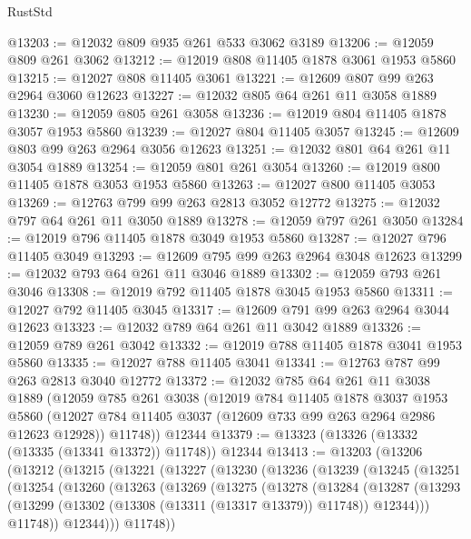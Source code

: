 \begin{lexlean}{RustStd}
\begin{coremodule}
{\begin{coremodule}
{{{{{{{{{{{{{{{{{{{{{{{{{{{{{@13203 := @12032 @809 @935 @261 @533 @3062 @3189
@13206 := @12059 @809 @261 @3062
@13212 := @12019 @808 @11405 @1878 @3061 @1953 @5860
@13215 := @12027 @808 @11405 @3061
@13221 := @12609 @807 @99 @263 @2964 @3060 @12623
@13227 := @12032 @805 @64 @261 @11 @3058 @1889
@13230 := @12059 @805 @261 @3058
@13236 := @12019 @804 @11405 @1878 @3057 @1953 @5860
@13239 := @12027 @804 @11405 @3057
@13245 := @12609 @803 @99 @263 @2964 @3056 @12623
@13251 := @12032 @801 @64 @261 @11 @3054 @1889
@13254 := @12059 @801 @261 @3054
@13260 := @12019 @800 @11405 @1878 @3053 @1953 @5860
@13263 := @12027 @800 @11405 @3053
@13269 := @12763 @799 @99 @263 @2813 @3052 @12772
@13275 := @12032 @797 @64 @261 @11 @3050 @1889
@13278 := @12059 @797 @261 @3050
@13284 := @12019 @796 @11405 @1878 @3049 @1953 @5860
@13287 := @12027 @796 @11405 @3049
@13293 := @12609 @795 @99 @263 @2964 @3048 @12623
@13299 := @12032 @793 @64 @261 @11 @3046 @1889
@13302 := @12059 @793 @261 @3046
@13308 := @12019 @792 @11405 @1878 @3045 @1953 @5860
@13311 := @12027 @792 @11405 @3045
@13317 := @12609 @791 @99 @263 @2964 @3044 @12623
@13323 := @12032 @789 @64 @261 @11 @3042 @1889
@13326 := @12059 @789 @261 @3042
@13332 := @12019 @788 @11405 @1878 @3041 @1953 @5860
@13335 := @12027 @788 @11405 @3041
@13341 := @12763 @787 @99 @263 @2813 @3040 @12772
@13372 := @12032
    @785
    @64
    @261
    @11
    @3038
    @1889
    (@12059
      @785
      @261
      @3038
      (@12019
        @784
        @11405
        @1878
        @3037
        @1953
        @5860
        (@12027 @784 @11405 @3037 (@12609 @733 @99 @263 @2964 @2986 @12623 @12928))
        @11748))
    @12344
@13379 := @13323 (@13326 (@13332 (@13335 (@13341 @13372)) @11748)) @12344
@13413 := @13203
    (@13206
      (@13212
        (@13215
          (@13221
            (@13227
              (@13230
                (@13236
                  (@13239
                    (@13245
                      (@13251
                        (@13254
                          (@13260
                            (@13263
                              (@13269
                                (@13275
                                  (@13278
                                    (@13284
                                      (@13287
                                        (@13293
                                          (@13299
                                            (@13302 (@13308 (@13311 (@13317 @13379)) @11748))
                                            @12344)))
                                      @11748))
                                  @12344)))
                            @11748))
}}}}}}}}}}}}}}}}}}}}}}}}}}}}}
\end{coremodule}}
\end{coremodule}
\end{lexlean}
